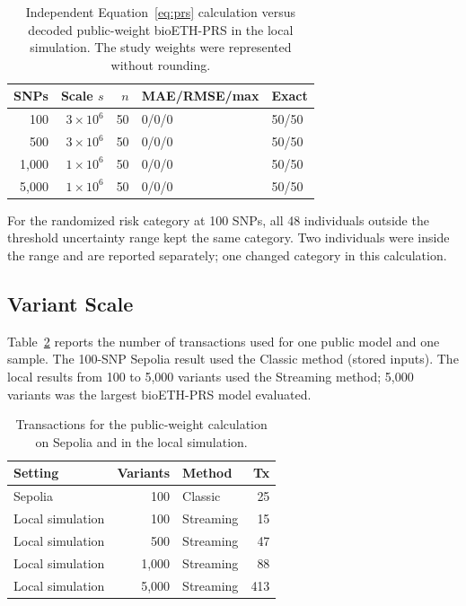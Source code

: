 \documentclass[10pt]{article}
\begin{document}
\begin{table}[!htbp]
\centering
\caption{Independent Equation~\ref{eq:prs} calculation versus decoded public-weight
bioETH-PRS in the local simulation. The study weights were represented without rounding.}
\label{tab:quantization}
\small
\begin{tabular}{rrrll}
\toprule
\textbf{SNPs} & \textbf{Scale $s$} & \textbf{$n$} & \textbf{MAE/RMSE/max} & \textbf{Exact} \\
\midrule
100   & $3\times10^6$ & 50 & 0/0/0 & 50/50 \\
500   & $3\times10^6$ & 50 & 0/0/0 & 50/50 \\
1,000 & $1\times10^6$ & 50 & 0/0/0 & 50/50 \\
5,000 & $1\times10^6$ & 50 & 0/0/0 & 50/50 \\
\bottomrule
\end{tabular}
\end{table}

For the randomized risk category at 100 SNPs, all 48 individuals outside the
threshold uncertainty range kept the same category.  Two individuals were inside the
range and are reported separately; one changed category in this calculation.

\subsection{Variant Scale}

Table~\ref{tab:scale_evidence} reports the number of transactions used for one public
model and one sample.  The 100-SNP Sepolia result used the Classic method (stored inputs).  The local
results from 100 to 5,000 variants used the Streaming method; 5,000 variants was the
largest bioETH-PRS model evaluated.

\begin{table}[ht]
\centering
\caption{Transactions for the public-weight calculation on Sepolia and in the local
simulation.}
\label{tab:scale_evidence}
\small
\begin{tabular}{lrlr}
\toprule
\textbf{Setting} & \textbf{Variants} & \textbf{Method} & \textbf{Tx} \\
\midrule
Sepolia & 100 & Classic & 25 \\
Local simulation & 100 & Streaming & 15 \\
Local simulation & 500 & Streaming & 47 \\
Local simulation & 1,000 & Streaming & 88 \\
Local simulation & 5,000 & Streaming & 413 \\
\bottomrule
\end{tabular}
\end{table}
\end{document}
